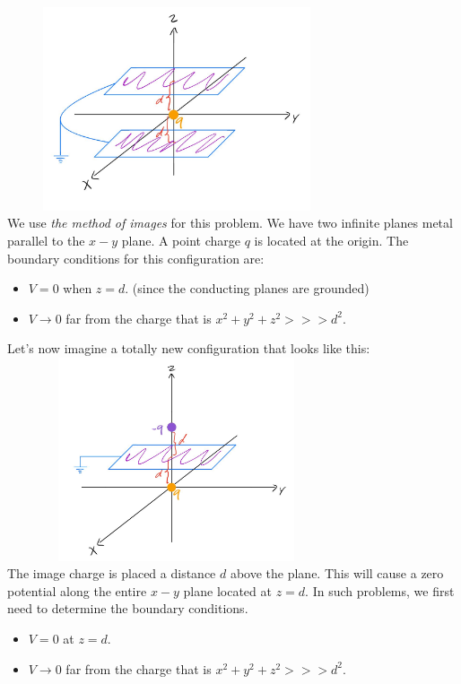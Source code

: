 \documentclass[fleqn]{article}
\begin{document}
\begin{enumerate}
      \textcolor{hwColor}{
        \includegraphics[height=6cm, width=10cm]{Three.JPG}
        \\
        We use \emph{the method of images} for this problem. We have two infinite planes metal parallel to the $x-y$ plane. A point charge $q$ is located
        at the origin. The boundary conditions for this configuration are:
        \begin{itemize}
          \item $V=0$ when $z=d$. (since the conducting planes are grounded)
          \item $V \to 0$ far from the charge that is $x^2+y^2+z^2 >>> d^2$.
        \end{itemize}
        Let's now imagine a totally new configuration that looks like this:
        \\
        \includegraphics[height=6cm, width=10cm]{Four.JPG}
        \\
        The image charge is placed a distance $d$ above the plane. This will cause a zero potential along the entire $x-y$ plane located at $z=d$. In such
        problems, we first need to determine the boundary conditions.
        \begin{itemize}
          \item $V=0$ at $z=d$.
          \item $V \to 0$ far from the charge that is $x^2+y^2+z^2 >>> d^2$.

\end{itemize}}
\end{enumerate}
\end{document}

